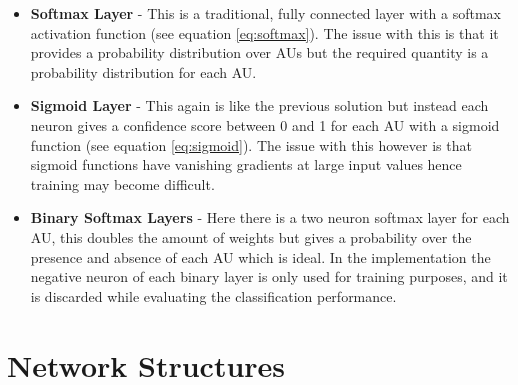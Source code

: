     \begin{itemize} \label{sec:binsoft}
      \item {\bf Softmax Layer} - This is a traditional, fully connected layer with
      a softmax activation function (see equation \ref{eq:softmax}).
      The issue with this is that it provides a probability distribution over AUs
      but the required quantity is a probability distribution for each AU.
      \item {\bf Sigmoid Layer} - This again is like the previous solution but instead each neuron gives a confidence
      score between 0 and 1 for each AU with a sigmoid function (see equation \ref{eq:sigmoid}).
      The issue with this however is that sigmoid
      functions have vanishing gradients at large input values
      hence training may become difficult.
      \item {\bf Binary Softmax Layers} - Here there is a two neuron softmax layer
      for each AU, this doubles the amount of weights
      but gives a probability over the presence and
      absence of each AU which is ideal. In the implementation
      the negative neuron of each binary layer is only used for training purposes, and it is
      discarded while evaluating the classification performance.
    \end{itemize}




  \section{Network Structures}

